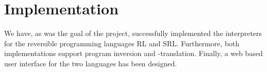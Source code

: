 \chapter*{Implementation}
%

We have, as was the goal of the project, successfully implemented the interpreters for the reversible programming languages RL and SRL. Furthermore, both implementations support program inversion and -translation. Finally, a web based user interface for the two languages has been designed.






